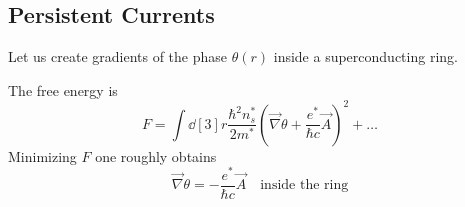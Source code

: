 \documentclass[12pt,a4paper,titlepage]{article}
\newcommand{\trm}[1]{\textrm{#1}} %
\begin{document}
\subsection{Persistent Currents}
Let us create gradients of the phase $\theta(r)$ inside a superconducting ring.
\begin{center}
\end{center}
The free energy is
\begin{equation}
F=\int\dd[3]{r}\frac{\hbar^{2}n_{s}^{*}}{2m^{*}}\left(\vec{\nabla}\theta+\frac{e^{*}}{\hbar c}\vec{A}\right)^{2}+\ldots
\end{equation}
Minimizing $F$ one roughly obtains
\begin{equation}
\vec{\nabla}\theta=-\frac{e^{*}}{\hbar c}\vec{A}\quad\trm{inside the ring}
\end{equation}
\end{document}
